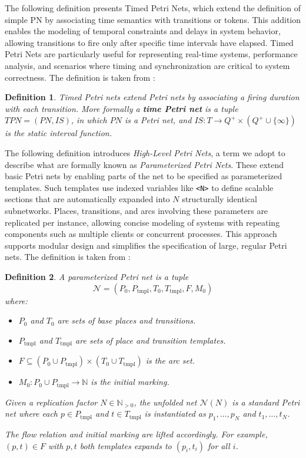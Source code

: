 \documentclass[12pt]{article}
\newtheorem{definition}{Definition}
\begin{document}
    The following definition presents Timed Petri Nets, which extend the definition of simple PN by associating time semantics with transitions or tokens. This addition enables the modeling of temporal constraints and delays in system behavior, allowing transitions to fire only after specific time intervals have elapsed. Timed Petri Nets are particularly useful for representing real-time systems, performance analysis, and scenarios where timing and synchronization are critical to system correctness.
    The definition is taken from \cite{diaz2013petri}:
    \begin{definition}
        Timed Petri nets extend Petri nets by associating a firing duration with each transition. More formally a \textbf{time Petri net} is a tuple $TPN=(PN,IS)$, in which $PN$ is a Petri net, and $IS:T\rightarrow Q^+ \times (Q^+ \cup \{\infty\})$ is the static interval function. 
    \end{definition}
        
    The following definition introduces \emph{High-Level Petri Nets}, a term we adopt to describe what are formally known as \emph{Parameterized Petri Nets}. These extend basic Petri nets by enabling parts of the net to be specified as parameterized templates. Such templates use indexed variables like \texttt{<N>} to define scalable sections that are automatically expanded into $N$ structurally identical subnetworks. Places, transitions, and arcs involving these parameters are replicated per instance, allowing concise modeling of systems with repeating components such as multiple clients or concurrent processes. This approach supports modular design and simplifies the specification of large, regular Petri nets.
    The definition is taken from \cite{diaz2013petri}:
    \begin{definition}
        A \emph{parameterized Petri net} is a tuple
\[
\mathcal{N} = (P_0, P_{\mathrm{tmpl}}, T_0, T_{\mathrm{tmpl}}, F, M_0)
\]
where:
\begin{itemize}
    \item $P_0$ and $T_0$ are sets of base places and transitions.
    \item $P_{\mathrm{tmpl}}$ and $T_{\mathrm{tmpl}}$ are sets of place and transition templates.
    \item $F \subseteq (P_0 \cup P_{\mathrm{tmpl}}) \times (T_0 \cup T_{\mathrm{tmpl}})$ is the arc set.
    \item $M_0 : P_0 \cup P_{\mathrm{tmpl}} \to \mathbb{N}$ is the initial marking.
\end{itemize}

Given a replication factor $N \in \mathbb{N}_{>0}$, the unfolded net $\mathcal{N}(N)$ is a standard Petri net where each $p \in P_{\mathrm{tmpl}}$ and $t \in T_{\mathrm{tmpl}}$ is instantiated as $p_1, \dots, p_N$ and $t_1, \dots, t_N$.

The flow relation and initial marking are lifted accordingly. For example, $(p, t) \in F$ with $p, t$ both templates expands to $(p_i, t_i)$ for all $i$.

    \end{definition}
\end{document}
